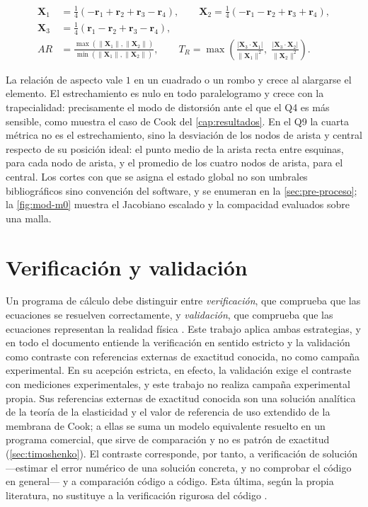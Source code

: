 \begin{equation}
\begin{aligned}
\bm{X}_1 &= \tfrac{1}{4}\left(-\bm{r}_1 + \bm{r}_2 + \bm{r}_3 - \bm{r}_4\right), \qquad
\bm{X}_2 = \tfrac{1}{4}\left(-\bm{r}_1 - \bm{r}_2 + \bm{r}_3 + \bm{r}_4\right), \\[2pt]
\bm{X}_3 &= \tfrac{1}{4}\left(\bm{r}_1 - \bm{r}_2 + \bm{r}_3 - \bm{r}_4\right), \\[4pt]
AR &= \frac{\max(\|\bm{X}_1\|, \|\bm{X}_2\|)}{\min(\|\bm{X}_1\|, \|\bm{X}_2\|)}, \qquad
T_R = \max\left(\frac{|\bm{X}_3 \cdot \bm{X}_1|}{\|\bm{X}_1\|^2},\; \frac{|\bm{X}_3 \cdot \bm{X}_2|}{\|\bm{X}_2\|^2}\right).
\end{aligned}
\label{eq:descomposicion-bilineal}
\end{equation}

La relación de aspecto vale $1$ en un cuadrado o un rombo y crece al alargarse el elemento. El estrechamiento es nulo en todo paralelogramo y crece con la trapecialidad: precisamente el modo de distorsión ante el que el Q4 es más sensible, como muestra el caso de Cook del \autoref{cap:resultados}. En el Q9 la cuarta métrica no es el estrechamiento, sino la desviación de los nodos de arista y central respecto de su posición ideal: el punto medio de la arista recta entre esquinas, para cada nodo de arista, y el promedio de los cuatro nodos de arista, para el central. Los cortes con que se asigna el estado global no son umbrales bibliográficos sino convención del software, y se enumeran en la \autoref{sec:pre-proceso}; la \autoref{fig:mod-m0} muestra el Jacobiano escalado y la compacidad evaluados sobre una malla.

\section{Verificación y validación}
\label{sec:verificacion-validacion}

Un programa de cálculo debe distinguir entre \emph{verificación}, que comprueba que las ecuaciones se resuelven correctamente, y \emph{validación}, que comprueba que las ecuaciones representan la realidad física \autocite[pp.~13-14]{oberkampf2010vv}. Este trabajo aplica ambas estrategias, y en todo el documento entiende la verificación en sentido estricto y la validación como contraste con referencias externas de exactitud conocida, no como campaña experimental. En su acepción estricta, en efecto, la validación exige el contraste con mediciones experimentales, y este trabajo no realiza campaña experimental propia. Sus referencias externas de exactitud conocida son una solución analítica de la teoría de la elasticidad y el valor de referencia de uso extendido de la membrana de Cook; a ellas se suma un modelo equivalente resuelto en un programa comercial, que sirve de comparación y no es patrón de exactitud (\autoref{sec:timoshenko}). El contraste corresponde, por tanto, a verificación de solución ---estimar el error numérico de una solución concreta, y no comprobar el código en general--- y a comparación código a código. Esta última, según la propia literatura, no sustituye a la verificación rigurosa del código \autocite[pp.~173-174]{oberkampf2010vv}.

